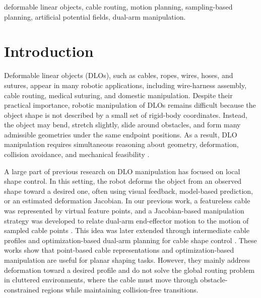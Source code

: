 \documentclass{pas}
\begin{document}
\begin{keywords} deformable linear objects, cable routing, motion planning,
sampling-based planning, artificial potential fields, dual-arm manipulation.
\end{keywords}


\maketitle


\section{Introduction}
\label{sec:introduction}

Deformable linear objects (DLOs), such as cables, ropes, wires, hoses, and sutures, appear in many robotic applications, including wire-harness assembly, cable routing, medical suturing, and domestic manipulation. Despite their practical importance, robotic manipulation of DLOs remains difficult because the object shape is not described by a small set of rigid-body coordinates. Instead, the object may bend, stretch slightly, slide around obstacles, and form many admissible geometries under the same endpoint positions. As a result, DLO manipulation requires simultaneous reasoning about geometry, deformation, collision avoidance, and mechanical feasibility \cite{Sanchez2018Survey,Yin2021Survey,Zhu2022ChallengesOutlook,Caporali2026Survey}.

A large part of previous research on DLO manipulation has focused on local shape control. In this setting, the robot deforms the object from an observed shape toward a desired one, often using visual feedback, model-based prediction, or an estimated deformation Jacobian. In our previous work, a featureless cable was represented by virtual feature points, and a Jacobian-based manipulation strategy was developed to relate dual-arm end-effector motion to the motion of sampled cable points \cite{AlmaghoutKlimchik2022VFP}. This idea was later extended through intermediate cable profiles and optimization-based dual-arm planning for cable shape control \cite{AlmaghoutKlimchik2024CableShapeControl,AlmaghoutCherubiniKlimchik2024LargeDeformation}. These works show that point-based cable representations and optimization-based manipulation are useful for planar shaping tasks. However, they mainly address deformation toward a desired profile and do not solve the global routing problem in cluttered environments, where the cable must move through obstacle-constrained regions while maintaining collision-free transitions.
\end{document}
